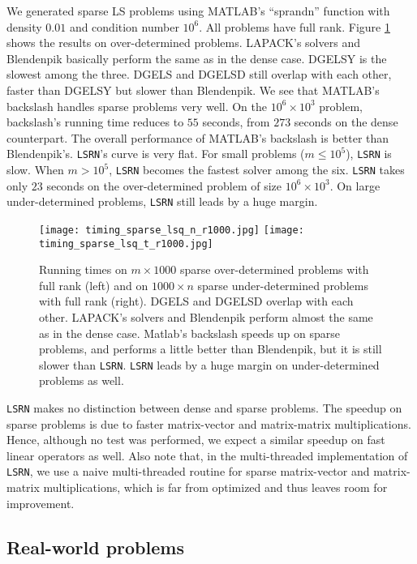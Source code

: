 \documentclass{siamltex}
\begin{document}
We generated sparse LS problems using MATLAB's ``sprandn'' function with density
$0.01$ and condition number $10^6$. All problems have full rank. Figure
\ref{fig:timing_sparse_full_rank} shows the results on over-determined
problems. LAPACK's solvers and Blendenpik basically perform the same as in the
dense case. DGELSY is the slowest among the three. DGELS and DGELSD still
overlap with each other, faster than DGELSY but slower than Blendenpik. We see
that MATLAB's backslash handles sparse problems very well. On the $10^6 \times
10^3$ problem, backslash's running time reduces to $55$ seconds, from $273$
seconds on the dense counterpart. The overall performance of MATLAB's backslash
is better than Blendenpik's. \texttt{LSRN}'s curve is very flat. For small
problems ($m \leq 10^5$), \texttt{LSRN} is slow. When $m > 10^5$, \texttt{LSRN}
becomes the fastest solver among the six. \texttt{LSRN} takes only $23$ seconds
on the over-determined problem of size $10^6 \times 10^3$. On large
under-determined problems, \texttt{LSRN} still leads by a huge margin.
\begin{figure}
  \centering
  \texttt{[image: timing\_sparse\_lsq\_n\_r1000.jpg]}
  \texttt{[image: timing\_sparse\_lsq\_t\_r1000.jpg]}
  \caption{Running times on $m \times 1000$ sparse over-determined problems with
    full rank (left) and on $1000 \times n$ sparse under-determined problems
    with full rank (right). DGELS and DGELSD overlap with each other. LAPACK's
    solvers and Blendenpik perform almost the same as in the dense
    case. {\sc Matlab}'s backslash speeds up on sparse problems, and performs a
    little better than Blendenpik, but it is still slower than
    \texttt{LSRN}. \texttt{LSRN} leads by a huge margin on under-determined
    problems as well.}
  \label{fig:timing_sparse_full_rank}
\end{figure}

\texttt{LSRN} makes no distinction between dense and sparse problems.  The
speedup on sparse problems is due to faster matrix-vector and matrix-matrix
multiplications.  Hence, although no test was performed, we expect a similar
speedup on fast linear operators as well.  Also note that, in the multi-threaded
implementation of \texttt{LSRN}, we use a naive multi-threaded routine for
sparse matrix-vector and matrix-matrix multiplications, which is far from
optimized and thus leaves room for improvement.

\subsection{Real-world problems}
\label{sec:real-world-prob}
\end{document}
